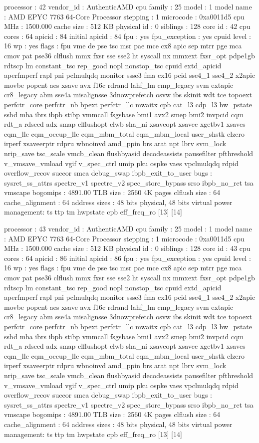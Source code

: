 processor	: 42
vendor_id	: AuthenticAMD
cpu family	: 25
model		: 1
model name	: AMD EPYC 7763 64-Core Processor
stepping	: 1
microcode	: 0xa0011d5
cpu MHz		: 1500.000
cache size	: 512 KB
physical id	: 0
siblings	: 128
core id		: 42
cpu cores	: 64
apicid		: 84
initial apicid	: 84
fpu		: yes
fpu_exception	: yes
cpuid level	: 16
wp		: yes
flags		: fpu vme de pse tsc msr pae mce cx8 apic sep mtrr pge mca cmov pat pse36 clflush mmx fxsr sse sse2 ht syscall nx mmxext fxsr_opt pdpe1gb rdtscp lm constant_tsc rep_good nopl nonstop_tsc cpuid extd_apicid aperfmperf rapl pni pclmulqdq monitor ssse3 fma cx16 pcid sse4_1 sse4_2 x2apic movbe popcnt aes xsave avx f16c rdrand lahf_lm cmp_legacy svm extapic cr8_legacy abm sse4a misalignsse 3dnowprefetch osvw ibs skinit wdt tce topoext perfctr_core perfctr_nb bpext perfctr_llc mwaitx cpb cat_l3 cdp_l3 hw_pstate ssbd mba ibrs ibpb stibp vmmcall fsgsbase bmi1 avx2 smep bmi2 invpcid cqm rdt_a rdseed adx smap clflushopt clwb sha_ni xsaveopt xsavec xgetbv1 xsaves cqm_llc cqm_occup_llc cqm_mbm_total cqm_mbm_local user_shstk clzero irperf xsaveerptr rdpru wbnoinvd amd_ppin brs arat npt lbrv svm_lock nrip_save tsc_scale vmcb_clean flushbyasid decodeassists pausefilter pfthreshold v_vmsave_vmload vgif v_spec_ctrl umip pku ospke vaes vpclmulqdq rdpid overflow_recov succor smca debug_swap ibpb_exit_to_user
bugs		: sysret_ss_attrs spectre_v1 spectre_v2 spec_store_bypass srso ibpb_no_ret tsa vmscape
bogomips	: 4891.00
TLB size	: 2560 4K pages
clflush size	: 64
cache_alignment	: 64
address sizes	: 48 bits physical, 48 bits virtual
power management: ts ttp tm hwpstate cpb eff_freq_ro [13] [14]

processor	: 43
vendor_id	: AuthenticAMD
cpu family	: 25
model		: 1
model name	: AMD EPYC 7763 64-Core Processor
stepping	: 1
microcode	: 0xa0011d5
cpu MHz		: 1500.000
cache size	: 512 KB
physical id	: 0
siblings	: 128
core id		: 43
cpu cores	: 64
apicid		: 86
initial apicid	: 86
fpu		: yes
fpu_exception	: yes
cpuid level	: 16
wp		: yes
flags		: fpu vme de pse tsc msr pae mce cx8 apic sep mtrr pge mca cmov pat pse36 clflush mmx fxsr sse sse2 ht syscall nx mmxext fxsr_opt pdpe1gb rdtscp lm constant_tsc rep_good nopl nonstop_tsc cpuid extd_apicid aperfmperf rapl pni pclmulqdq monitor ssse3 fma cx16 pcid sse4_1 sse4_2 x2apic movbe popcnt aes xsave avx f16c rdrand lahf_lm cmp_legacy svm extapic cr8_legacy abm sse4a misalignsse 3dnowprefetch osvw ibs skinit wdt tce topoext perfctr_core perfctr_nb bpext perfctr_llc mwaitx cpb cat_l3 cdp_l3 hw_pstate ssbd mba ibrs ibpb stibp vmmcall fsgsbase bmi1 avx2 smep bmi2 invpcid cqm rdt_a rdseed adx smap clflushopt clwb sha_ni xsaveopt xsavec xgetbv1 xsaves cqm_llc cqm_occup_llc cqm_mbm_total cqm_mbm_local user_shstk clzero irperf xsaveerptr rdpru wbnoinvd amd_ppin brs arat npt lbrv svm_lock nrip_save tsc_scale vmcb_clean flushbyasid decodeassists pausefilter pfthreshold v_vmsave_vmload vgif v_spec_ctrl umip pku ospke vaes vpclmulqdq rdpid overflow_recov succor smca debug_swap ibpb_exit_to_user
bugs		: sysret_ss_attrs spectre_v1 spectre_v2 spec_store_bypass srso ibpb_no_ret tsa vmscape
bogomips	: 4891.00
TLB size	: 2560 4K pages
clflush size	: 64
cache_alignment	: 64
address sizes	: 48 bits physical, 48 bits virtual
power management: ts ttp tm hwpstate cpb eff_freq_ro [13] [14]

